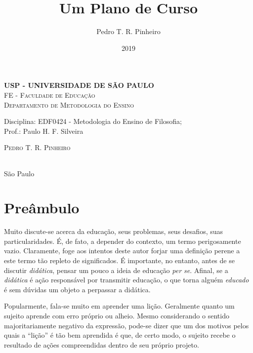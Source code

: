 \documentclass[12pt,a4paper]{article}
\author{Pedro T. R. Pinheiro}
\date{2019}
\title{Um Plano de Curso}
\newcommand{\subtitulo}{}
\newcommand{\disciplina}{EDF0424 - Metodologia do Ensino de Filosofia}
\newcommand{\departamento}{Departamento de Metodologia do Ensino}
\newcommand{\unidade}{FE - Faculdade de Educação}
\newcommand{\prof}{Paulo H. F. Silveira}
\begin{document}
	\begin{center}
				\textbf{
				\LARGE USP - UNIVERSIDADE DE SÃO PAULO \\
			}
			\Large \textsc{\unidade} \\
			\large \textsc{\departamento}\\
			\vspace*{1cm}
				
			Disciplina: \disciplina; \\Prof.: \prof
			\vfill
			\begin{center}
				{\Large \textsc{Pedro T. R. Pinheiro}} \\ 
				\vspace{1cm}
				\LARGE\textbf{\thetitle} \\
				\Large\emph{\subtitulo}
			\end{center}
			\vfill
			\large São Paulo \\
			\large\thedate
			\vspace*{1cm}
			\thispagestyle{empty}
	\end{center}

	\newpage
	
	\setlength{\parskip}{0.5cm}
	\setlength{\parindent}{1.1cm}
	\onehalfspacing	
	
	\section*{Preâmbulo}
	
	
	Muito discute-se acerca da educação, seus problemas, seus desafios, suas particularidades. É, de fato, a depender do contexto, um termo perigosamente vazio. Claramente, foge aos intentos deste autor forjar uma definição perene a este termo tão repleto de significados. É importante, no entanto, antes de se discutir \textit{didática}, pensar um pouco a ideia de educação \textit{per se}. Afinal, se a \textit{didática} é ação responsável por transmitir educação, o que torna alguém \textit{educado} é sem dúvidas um objeto a perpassar a didática. 
	
	Popularmente, fala-se muito em aprender uma lição. Geralmente quanto um sujeito aprende com erro próprio ou alheio. Mesmo considerando o sentido majoritariamente negativo da expressão, pode-se dizer que um dos motivos pelos quais a “lição” é tão bem aprendida é que, de certo modo, o sujeito recebe o resultado de ações compreendidas dentro de seu próprio projeto. 
	
\end{document}
